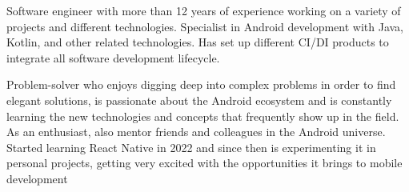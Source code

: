 

\begin{cvparagraph}

Software engineer with more than 12 years of experience working on a variety of projects and different technologies. Specialist in Android development with Java, Kotlin, and other related technologies. Has set up different CI/DI products to integrate all software development lifecycle.

Problem-solver who enjoys digging deep into complex problems in order to find elegant solutions, is passionate about the Android ecosystem and is constantly learning the new technologies and concepts that frequently show up in the field. As an enthusiast, also mentor friends and colleagues in the Android universe. Started learning React Native in 2022 and since then is experimenting it in personal projects, getting very excited with the opportunities it brings to mobile development
\end{cvparagraph}
